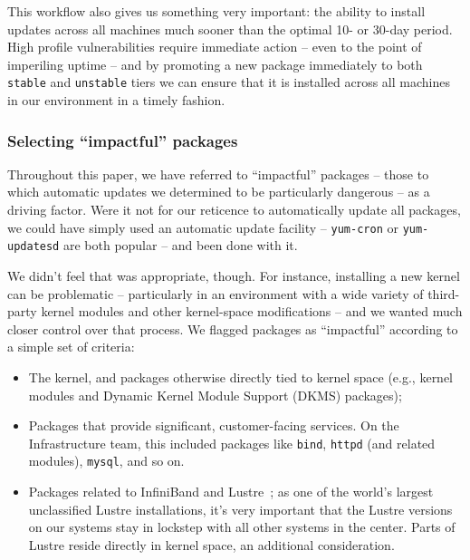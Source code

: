 This workflow also gives us something very important: the ability to
install updates across all machines much sooner than the optimal 10-
or 30-day period.  High profile vulnerabilities require immediate
action -- even to the point of imperiling uptime -- and by promoting a
new package immediately to both \texttt{stable} and \texttt{unstable}
tiers we can ensure that it is installed across all machines in our
environment in a timely fashion.

\subsubsection{Selecting ``impactful'' packages}

Throughout this paper, we have referred to ``impactful'' packages --
those to which automatic updates we determined to be particularly
dangerous -- as a driving factor.  Were it not for our reticence to
automatically update all packages, we could have simply used an
automatic update facility -- \texttt{yum-cron} or
\texttt{yum-updatesd} are both popular -- and been done with it.

We didn't feel that was appropriate, though.  For instance, installing
a new kernel can be problematic -- particularly in an environment with
a wide variety of third-party kernel modules and other kernel-space
modifications -- and we wanted much closer control over that process.
We flagged packages as ``impactful'' according to a simple set of
criteria:

\begin{itemize}

\item The kernel, and packages otherwise directly tied to kernel space
  (e.g., kernel modules and Dynamic Kernel Module Support (DKMS)
  packages);

\item Packages that provide significant, customer-facing services.  On
  the Infrastructure team, this included packages like \texttt{bind},
  \texttt{httpd} (and related modules), \texttt{mysql}, and so on.

\item Packages related to InfiniBand and Lustre~\cite{Ora10}; as one
  of the world's largest unclassified Lustre installations, it's very
  important that the Lustre versions on our systems stay in lockstep
  with all other systems in the center.  Parts of Lustre reside
  directly in kernel space, an additional consideration.

\end{itemize}

